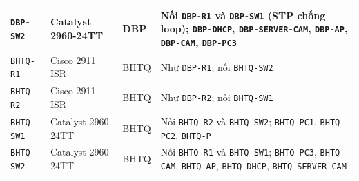 \begin{small}
\begin{longtable}{|p{2.5cm}|p{2.6cm}|p{2.7cm}|p{6.0cm}|}
\texttt{DBP-SW2} & Catalyst 2960-24TT & DBP & Nối \texttt{DBP-R1} và \texttt{DBP-SW1} (STP chống loop); \texttt{DBP-DHCP}, \texttt{DBP-SERVER-CAM}, \texttt{DBP-AP}, \texttt{DBP-CAM}, \texttt{DBP-PC3} \\ \hline
\texttt{BHTQ-R1} & Cisco 2911 ISR & BHTQ & Như \texttt{DBP-R1}; nối \texttt{BHTQ-SW2} \\ \hline
\texttt{BHTQ-R2} & Cisco 2911 ISR & BHTQ & Như \texttt{DBP-R2}; nối \texttt{BHTQ-SW1} \\ \hline
\texttt{BHTQ-SW1} & Catalyst 2960-24TT & BHTQ & Nối \texttt{BHTQ-R2} và \texttt{BHTQ-SW2}; \texttt{BHTQ-PC1}, \texttt{BHTQ-PC2}, \texttt{BHTQ-P} \\ \hline
\texttt{BHTQ-SW2} & Catalyst 2960-24TT & BHTQ & Nối \texttt{BHTQ-R1} và \texttt{BHTQ-SW1}; \texttt{BHTQ-PC3}, \texttt{BHTQ-CAM}, \texttt{BHTQ-AP}, \texttt{BHTQ-DHCP}, \texttt{BHTQ-SERVER-CAM} \\ \hline
\end{longtable}
\end{small}

